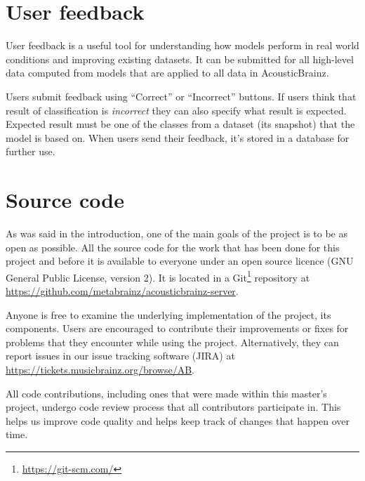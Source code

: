 
\section{User feedback}

User feedback is a useful tool for understanding how models perform in real world conditions and improving existing datasets. It can be submitted for all high-level data computed from models that are applied to all data in AcousticBrainz.

Users submit feedback using ``Correct'' or ``Incorrect'' buttons. If users think that result of classification is \emph{incorrect} they can also specify what result is expected. Expected result must be one of the classes from a dataset (its snapshot) that the model is based on. When users send their feedback, it's stored in a database for further use.


\section{Source code}

As was said in the introduction, one of the main goals of the project is to be as open as possible. All the source code for the work that has been done for this project and before it is available to everyone under an open source licence (GNU General Public License, version 2). It is located in a Git\footnote{\url{https://git-scm.com/}} repository at \url{https://github.com/metabrainz/acousticbrainz-server}.

Anyone is free to examine the underlying implementation of the project, its components. Users are encouraged to contribute their improvements or fixes for problems that they encounter while using the project. Alternatively, they can report issues in our issue tracking software (JIRA) at \url{https://tickets.musicbrainz.org/browse/AB}.

All code contributions, including ones that were made within this master's project, undergo code review process that all contributors participate in. This helps us improve code quality and helps keep track of changes that happen over time.

